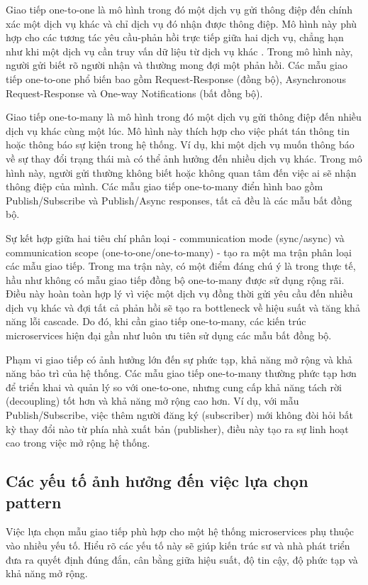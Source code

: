 Giao tiếp one-to-one là mô hình trong đó một dịch vụ gửi thông điệp đến chính xác một dịch vụ khác và chỉ dịch vụ đó nhận được thông điệp. Mô hình này phù hợp cho các tương tác yêu cầu-phản hồi trực tiếp giữa hai dịch vụ, chẳng hạn như khi một dịch vụ cần truy vấn dữ liệu từ dịch vụ khác \cite{richardson2019}. Trong mô hình này, người gửi biết rõ người nhận và thường mong đợi một phản hồi. Các mẫu giao tiếp one-to-one phổ biến bao gồm Request-Response (đồng bộ), Asynchronous Request-Response và One-way Notifications (bất đồng bộ).

Giao tiếp one-to-many là mô hình trong đó một dịch vụ gửi thông điệp đến nhiều dịch vụ khác cùng một lúc. Mô hình này thích hợp cho việc phát tán thông tin hoặc thông báo sự kiện trong hệ thống. Ví dụ, khi một dịch vụ muốn thông báo về sự thay đổi trạng thái mà có thể ảnh hưởng đến nhiều dịch vụ khác. Trong mô hình này, người gửi thường không biết hoặc không quan tâm đến việc ai sẽ nhận thông điệp của mình. Các mẫu giao tiếp one-to-many điển hình bao gồm Publish/Subscribe và Publish/Async responses, tất cả đều là các mẫu bất đồng bộ.

Sự kết hợp giữa hai tiêu chí phân loại - communication mode (sync/async) và communication scope (one-to-one/one-to-many) - tạo ra một ma trận phân loại các mẫu giao tiếp. Trong ma trận này, có một điểm đáng chú ý là trong thực tế, hầu như không có mẫu giao tiếp đồng bộ one-to-many được sử dụng rộng rãi. Điều này hoàn toàn hợp lý vì việc một dịch vụ đồng thời gửi yêu cầu đến nhiều dịch vụ khác và đợi tất cả phản hồi sẽ tạo ra bottleneck về hiệu suất và tăng khả năng lỗi cascade. Do đó, khi cần giao tiếp one-to-many, các kiến trúc microservices hiện đại gần như luôn ưu tiên sử dụng các mẫu bất đồng bộ.

Phạm vi giao tiếp có ảnh hưởng lớn đến sự phức tạp, khả năng mở rộng và khả năng bảo trì của hệ thống. Các mẫu giao tiếp one-to-many thường phức tạp hơn để triển khai và quản lý so với one-to-one, nhưng cung cấp khả năng tách rời (decoupling) tốt hơn và khả năng mở rộng cao hơn. Ví dụ, với mẫu Publish/Subscribe, việc thêm người đăng ký (subscriber) mới không đòi hỏi bất kỳ thay đổi nào từ phía nhà xuất bản (publisher), điều này tạo ra sự linh hoạt cao trong việc mở rộng hệ thống.

\subsection{Các yếu tố ảnh hưởng đến việc lựa chọn pattern}
Việc lựa chọn mẫu giao tiếp phù hợp cho một hệ thống microservices phụ thuộc vào nhiều yếu tố. Hiểu rõ các yếu tố này sẽ giúp kiến trúc sư và nhà phát triển đưa ra quyết định đúng đắn, cân bằng giữa hiệu suất, độ tin cậy, độ phức tạp và khả năng mở rộng.

